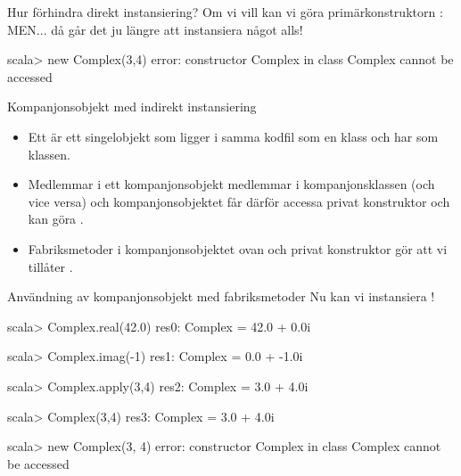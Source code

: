 \begin{Slide}{Hur förhindra direkt instansiering?}
Om vi vill  kan vi göra primärkonstruktorn :
MEN... då går det ju  längre att instansiera något alls!  \code{   :(}
\begin{REPLnonum}
scala> new Complex(3,4)
error:
 constructor Complex in class Complex cannot be accessed
\end{REPLnonum}
\end{Slide}



\begin{Slide}{Kompanjonsobjekt med indirekt instansiering}\SlideFontSmall
\setlength{\leftmargini}{0pt}
\begin{itemize}
\item Ett   är ett singelobjekt som ligger i samma kodfil som en klass och har  som klassen.

\item Medlemmar i ett kompanjonsobjekt  medlemmar i kompanjonsklassen (och vice versa) och kompanjonsobjektet får därför accessa privat konstruktor och kan göra .

\item Fabriksmetoder i kompanjonsobjektet ovan och privat konstruktor gör att vi  tillåter .
\end{itemize}
\end{Slide}

\begin{Slide}{Användning av kompanjonsobjekt med fabriksmetoder}
Nu kan vi  instansiera !  \code{   :)}
\begin{REPLnonum}
scala> Complex.real(42.0)
res0: Complex = 42.0 + 0.0i

scala> Complex.imag(-1)
res1: Complex = 0.0 + -1.0i

scala> Complex.apply(3,4)
res2: Complex = 3.0 + 4.0i

scala> Complex(3,4)
res3: Complex = 3.0 + 4.0i

scala> new Complex(3, 4)
error:
     constructor Complex in class Complex cannot be accessed
\end{REPLnonum}
\end{Slide}


